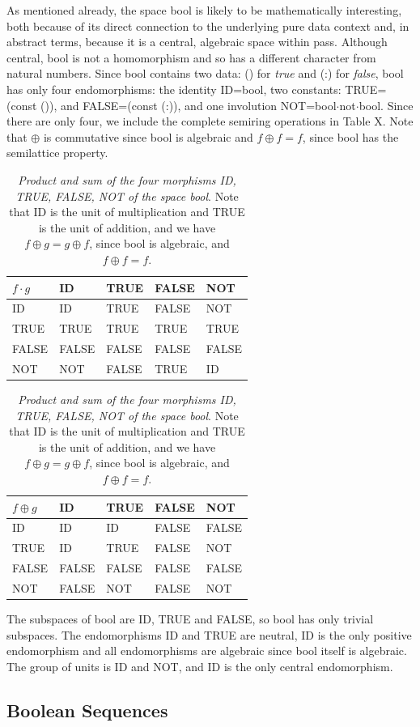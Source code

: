 \documentclass[11pt]{article}
\begin{document}
      As mentioned already, the space bool is likely to be mathematically interesting, both because of its direct connection to 
the underlying pure data context and, in abstract terms, because it is a central, algebraic space within pass.  Although central, bool is not a 
homomorphism and so has a different character from natural numbers.  
Since bool contains two data:  () for {\it true} and (:) for {\it false}, bool has only four endomorphisms:  
the identity ID=bool, two constants: TRUE=(const ()), and FALSE=(const (:)), and one involution NOT=bool$\cdot$not$\cdot$bool.  
Since there are only four, we include the complete semiring operations in Table X.  Note that $\oplus$ is commutative since 
bool is algebraic and $f\oplus f=f$, since bool has the semilattice property.  
\begin{table}
\begin{tabular}{| l | l | l | l | l |  }
$f\cdot g$ & ID & TRUE & FALSE & NOT  \\
\hline
ID &  ID & TRUE & FALSE &  NOT \\
TRUE & TRUE & TRUE  & TRUE & TRUE \\
FALSE & FALSE  & FALSE & FALSE & FALSE   \\
NOT & NOT & FALSE & TRUE & ID \\
\hline
\end{tabular}
\begin{tabular}{| l | l | l | l | l |  }
$f\oplus g$ & ID & TRUE & FALSE & NOT  \\
\hline
ID &  ID & ID & FALSE & FALSE \\
TRUE & ID & TRUE  & FALSE & NOT \\
FALSE & FALSE  & FALSE & FALSE & FALSE   \\
NOT & FALSE & NOT & FALSE & NOT \\
\hline
\end{tabular}
\caption{{\it Product and sum of the four morphisms ID, TRUE, FALSE, NOT of the space bool}.  Note that ID is the unit of multiplication and TRUE is the 
unit of addition, and we have $f\oplus g=g\oplus f$, since bool is algebraic, and $f\oplus f=f$.}
\end{table}
The subspaces of bool are ID, TRUE and FALSE, so bool has only trivial subspaces.  The endomorphisms ID and TRUE are neutral, ID is the only positive 
endomorphism and all endomorphisms are algebraic since bool itself is algebraic.  The group of units is ID and NOT, and ID is the only central endomorphism. 

\subsection{Boolean Sequences}
\end{document}
